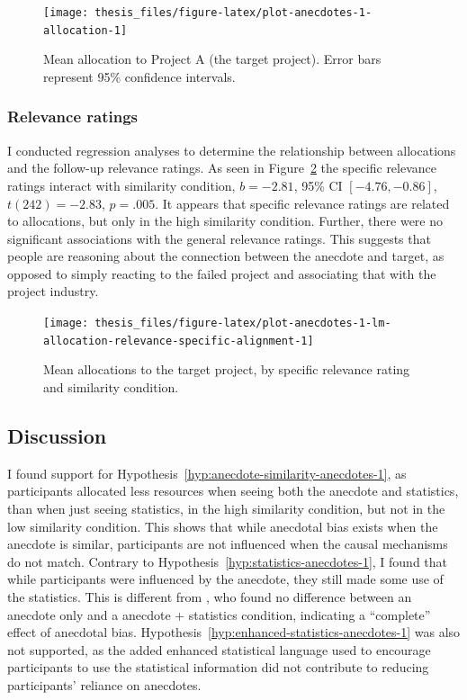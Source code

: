 \documentclass[a4paper, nobind, dvipsnames]{templates/ociamthesis}
\theoremstyle{definition}
\theoremstyle{definition}
\theoremstyle{definition}
\theoremstyle{definition}
\theoremstyle{remark}
\begin{document}
\begin{figure}
\texttt{[image: thesis\_files/figure-latex/plot-anecdotes-1-allocation-1]} \caption{Mean allocation to Project A (the target project). Error bars represent 95\% confidence intervals.}\label{fig:plot-anecdotes-1-allocation}
\end{figure}

\subsubsection{Relevance ratings}

I conducted regression analyses to determine the relationship between
allocations and the follow-up relevance ratings. As seen in
Figure~\ref{fig:plot-anecdotes-1-lm-allocation-relevance-specific-alignment}
the specific relevance ratings interact with similarity condition,
\(b = -2.81\), 95\% CI \([-4.76, -0.86]\), \(t(242) = -2.83\), \(p = .005\). It appears
that specific relevance ratings are related to allocations, but only in the high
similarity condition. Further, there were no significant associations with the
general relevance ratings. This suggests that people are reasoning about the
connection between the anecdote and target, as opposed to simply reacting to the
failed project and associating that with the project industry.



\begin{figure}
\texttt{[image: thesis\_files/figure-latex/plot-anecdotes-1-lm-allocation-relevance-specific-alignment-1]} \caption{Mean allocations to the target project, by specific relevance rating and similarity condition.}\label{fig:plot-anecdotes-1-lm-allocation-relevance-specific-alignment}
\end{figure}

\subsection{Discussion}

I found support for Hypothesis~\ref{hyp:anecdote-similarity-anecdotes-1}, as
participants allocated less resources when seeing both the anecdote and
statistics, than when just seeing statistics, in the high similarity condition,
but not in the low similarity condition. This shows that while anecdotal bias
exists when the anecdote is similar, participants are not influenced when the
causal mechanisms do not match. Contrary to
Hypothesis~\ref{hyp:statistics-anecdotes-1}, I found that while participants
were influenced by the anecdote, they still made some use of the statistics.
This is different from \textcite{wainberg2013}, who found no difference between an
anecdote only and a anecdote + statistics condition, indicating a ``complete''
effect of anecdotal bias. Hypothesis~\ref{hyp:enhanced-statistics-anecdotes-1}
was also not supported, as the added enhanced statistical language used to
encourage participants to use the statistical information did not contribute to
reducing participants' reliance on anecdotes.
\end{document}
